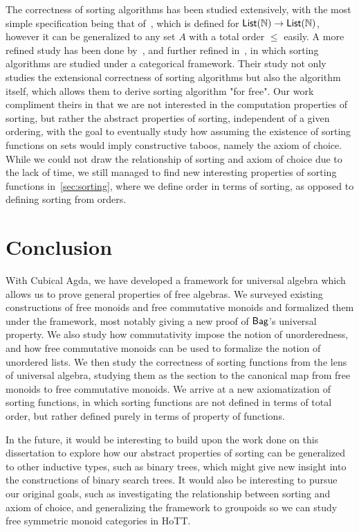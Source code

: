 The correctness of sorting algorithms has been studied extensively,
with the most simple specification being that of~\cite{appelVerifiedFunctionalAlgorithms2023},
which is defined for $\operatorname{\mathsf{List}}(\mathbb{N}) \to \operatorname{\mathsf{List}}(\mathbb{N})$, however it can be generalized
to any set $A$ with a total order $\leq$ easily. A more refined study has
been done by~\cite{hinzeSortingBialgebrasDistributive2012}, and further
refined in~\cite{alexandruIntrinsicallyCorrectSorting2023}, in which
sorting algorithms are studied under a categorical framework. Their study
not only studies the extensional correctness of sorting algorithms but
also the algorithm itself, which allows them to derive sorting algorithm
"for free". Our work compliment theirs in that we are not interested in the
computation properties of sorting, but rather the abstract properties of
sorting, independent of a given ordering, with the goal to eventually study
how assuming the existence of sorting functions on sets would imply
constructive taboos, namely the axiom of choice. While we could not draw
the relationship of sorting and axiom of choice due to the lack of time,
we still managed to find new interesting properties of sorting functions
in~\cref{sec:sorting}, where we define order in terms of sorting, as opposed
to defining sorting from orders.

\section{Conclusion}
With Cubical Agda, we have developed a framework for universal algebra
which allows us to prove general properties of free algebras.
We surveyed existing constructions of free monoids and
free commutative monoids and formalized them under the framework,
most notably giving a new proof of $\operatorname{\mathsf{Bag}}$'s universal property.
We also study how commutativity impose the notion of unorderedness,
and how free commutative monoids can be used to formalize the notion
of unordered lists. We then study the correctness of sorting functions
from the lens of universal algebra, studying them as the section to
the canonical map from free monoids to free commutative monoids.
We arrive at a new axiomatization of sorting functions, in which
sorting functions are not defined in terms of total order, but rather
defined purely in terms of property of functions.

In the future, it would be interesting to build upon the work done on this
dissertation to explore how our abstract properties of sorting can be
generalized to other inductive types, such as binary trees, which might
give new insight into the constructions of binary search trees. It would
also be interesting to pursue our original goals, such as investigating
the relationship between sorting and axiom of choice, and generalizing the
framework to groupoids so we can study free symmetric monoid categories
in HoTT.